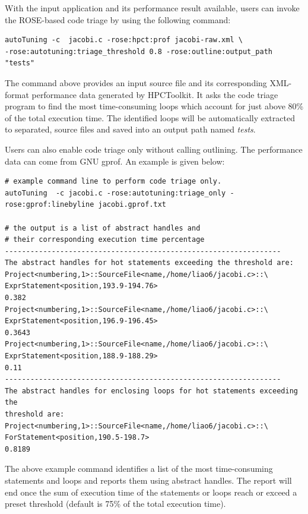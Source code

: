 With the input application and its performance result available, 
users can invoke the ROSE-based code triage by using the following command:

{\mySmallFontSize
\begin{verbatim}
autoTuning -c  jacobi.c -rose:hpct:prof jacobi-raw.xml \
-rose:autotuning:triage_threshold 0.8 -rose:outline:output_path "tests"
\end{verbatim}
}

The command above provides an input source file and its corresponding XML-format performance data generated by HPCToolkit.
It asks the code triage program to find the most time-consuming 
loops which account for just above 80\% of the total execution time. 
The identified loops will be automatically extracted to separated,
source files and saved into an output path named \textit{tests}.

Users can also enable code triage only without calling outlining. 
The performance data can come from GNU gprof. 
An example is given below:

{\mySmallFontSize
\begin{verbatim}
# example command line to perform code triage only.
autoTuning  -c jacobi.c -rose:autotuning:triage_only -rose:gprof:linebyline jacobi.gprof.txt 

# the output is a list of abstract handles and 
# their corresponding execution time percentage
-----------------------------------------------------------------
The abstract handles for hot statements exceeding the threshold are:
Project<numbering,1>::SourceFile<name,/home/liao6/jacobi.c>::\
ExprStatement<position,193.9-194.76>
0.382
Project<numbering,1>::SourceFile<name,/home/liao6/jacobi.c>::\
ExprStatement<position,196.9-196.45>
0.3643
Project<numbering,1>::SourceFile<name,/home/liao6/jacobi.c>::\
ExprStatement<position,188.9-188.29>
0.11
-----------------------------------------------------------------
The abstract handles for enclosing loops for hot statements exceeding the
threshold are:
Project<numbering,1>::SourceFile<name,/home/liao6/jacobi.c>::\
ForStatement<position,190.5-198.7>
0.8189
\end{verbatim}
}

The above example command identifies a list of the most time-consuming statements and loops and reports them using abstract handles. 
The report will end once the sum of execution time of the statements or
loops reach or exceed a preset threshold (default is 75\% of the total execution time). 

